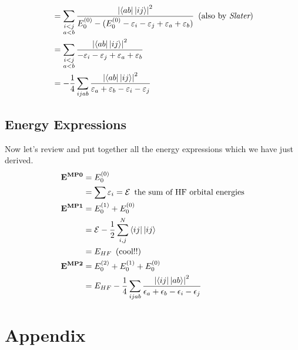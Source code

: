 \documentclass{article}
\newcommand{\suml}{\ensuremath{\sum\limits}}
\newcommand{\z}{\ensuremath{^{(0)}}}
\newcommand{\ve}{\ensuremath{\varepsilon}}
\newcommand{\eps}{\ensuremath{\epsilon}}
\begin{document}
\begin{align*}
&= \suml_{\substack{i<j\\a<b}} \frac{\left|  \bra{ab}\ket{ij} \right|^2}{E\z_0 -(E\z_0 -\ve_i -\ve_j +\ve_a + \ve_b)} \, \mbox{ (also by {\it Slater})} \\
&= \suml_{\substack{i<j\\a<b}} \frac{\left|  \bra{ab}\ket{ij} \right|^2}{- \ve_i - \ve_j  + \ve_a + \ve_b} \\
&= -   \frac{1}{4} \suml_{ijab} \frac{\left| \bra{ab}\ket{ij} \right|^2}{\ve_a + \ve_b- \ve_i - \ve_j}
\end{align*}


\subsection{Energy Expressions}
Now let's review and put together all the energy expressions which we have just derived.
\begin{align*}
\mathbf{E^{\textbf{MP0}}}&= E_0^{(0)} \\
&= \suml \ve_i = \mathcal{E} \, \mbox{ the sum of HF orbital energies}\\ 
\mathbf{E^{\textbf{MP1}}}&= E_0^{(1)} + E_0^{(0)} \\
&= \mathcal{E} - \frac{1}{2} \suml_{i,j}^{N} \bra{ij} \ket{ij} \\
&= E_{HF} \,  \mbox{ (cool!!)}             \\
\mathbf{E^{\textbf{MP2}}}&= E_0^{(2)} + E_0^{(1)}+ E_0^{(0)}  \\
&= E_{HF} - \frac{1}{4} \suml_{ijab} \frac{\left|\bra{ij} \ket{ab} \right|^2}{\eps_a + \eps_b -\eps_i -\eps_j}
\end{align*}



\newpage
\section{Appendix}
\end{document}
